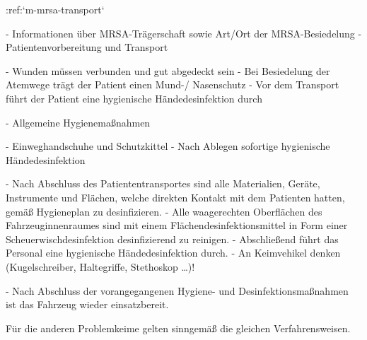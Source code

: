 %
:ref:`m-mrsa-transport`%
\label{proc:IU81001C}
\begin{itemize}
  -   Informationen über MRSA-Trägerschaft sowie Art/Ort der MRSA-Besiedelung
  -   Patientenvorbereitung und Transport
  \begin{itemize}
    -   Wunden müssen verbunden und gut abgedeckt sein
    -   Bei Besiedelung der Atemwege trägt der Patient einen Mund-/ Nasenschutz
    -   Vor dem Transport führt der Patient eine hygienische
    Händedesinfektion durch
  \end{itemize}
  -   Allgemeine Hygienemaßnahmen
  \begin{itemize}
    -   Einweghandschuhe und Schutzkittel
    -   Nach Ablegen sofortige hygienische Händedesinfektion
    \begin{itemize}
      -   Nach Abschluss des Patiententransportes sind alle Materialien,
      Geräte, Instrumente und Flächen, welche direkten Kontakt mit dem
      Patienten hatten, gemäß Hygieneplan zu
      desinfizieren.
      -   Alle waagerechten Oberflächen des Fahrzeuginnenraumes sind mit
      einem Flächendesinfektionsmittel in Form einer
      Scheuerwischdesinfektion desinfizierend zu reinigen.
      -   Abschließend führt das Personal eine hygienische
      Händedesinfektion durch.
      -   An Keimvehikel denken (Kugelschreiber, Haltegriffe, Stethoskop \ldots )!
    \end{itemize}
  \end{itemize}
  -   Nach Abschluss der vorangegangenen Hygiene- und
  Desinfektionsmaßnahmen ist das Fahrzeug wieder einsatzbereit.
\end{itemize}

Für die anderen Problemkeime  gelten sinngemäß die gleichen
Verfahrensweisen.
